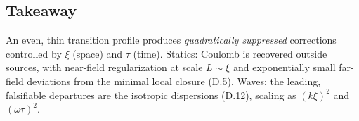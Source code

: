 \subsection{Takeaway}
An even, thin transition profile produces \emph{quadratically suppressed} corrections controlled by $\xi$ (space) and $\tau$ (time). Statics: Coulomb is recovered outside sources, with near-field regularization at scale $L\sim\xi$ and exponentially small far-field deviations from the minimal local closure (D.5). Waves: the leading, falsifiable departures are the isotropic dispersions (D.12), scaling as $(k\xi)^2$ and $(\omega\tau)^2$.
